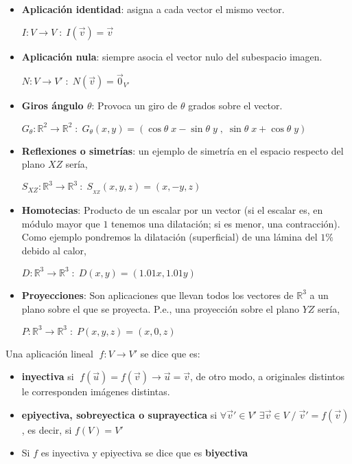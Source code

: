 \begin{itemize}

\item \textbf{Aplicación identidad}: asigna a cada vector el mismo vector. 

$I:V\to V\;:\; I(\vec v)=\vec v$

\item \textbf{Aplicación nula}: siempre asocia el vector nulo del subespacio imagen.

$N:V \to V'\; :\; N(\vec v)=\vec 0_{V'}$

\item \textbf{Giros ángulo $\theta$}: Provoca un giro de $\theta$ grados sobre el vector.

$G_{\theta}: \mathbb R^2 \to \mathbb R^2 \; : \; G_{\theta} (x,y)= (\cos \theta \;x - \sin \theta \;y \;,\; \sin \theta \;x + \cos \theta \;y)$

\item \textbf{Reflexiones o simetrías}: un ejemplo de simetría en el espacio respecto del plano $XZ$ sería,

$S_{XZ}:\mathbb R^3 \to \mathbb R^3 \: :\; S_{_{XZ}}(x,y,z)=(x,-y,z)$

\item \textbf{Homotecias}: Producto de un escalar por un vector (si el escalar es, en módulo mayor que $1$ tenemos una dilatación; si es menor, una contracción). Como ejemplo pondremos la dilatación (superficial) de una lámina del $1\%$ debido al calor,

$D:\mathbb R^3 \to \mathbb R^3\; : \; D(x,y)=(1.01x, 1.01y)$

\item \textbf{Proyecciones}: Son aplicaciones que llevan todos los vectores de $\mathbb R^3$ a un plano sobre el que se proyecta. P.e., una proyección sobre el plano $YZ$ sería,

$P:\mathbb R^3 \to \mathbb R^3\; :\; P(x,y,z)=(x,0,z)$

\end{itemize}

\begin{defi}
Una aplicación lineal $\; f:V\to V'$ se dice que es:
\begin{itemize}
\item \textbf{inyectiva} si $\; f(\vec u)=f(\vec v) \longrightarrow \vec u = \vec v$, de otro modo, a originales distintos le corresponden imágenes distintas.
\item \textbf{epiyectiva, sobreyectica o suprayectica} si $\forall \vec v' \in V' \; \exists \vec v \in V\; / \; \vec v' = f(\vec v)$, es decir, si $f(V)=V'$
\item Si $f$ es inyectiva y epiyectiva se dice que es \textbf{biyectiva}	
\end{itemize}
	
\end{defi}

